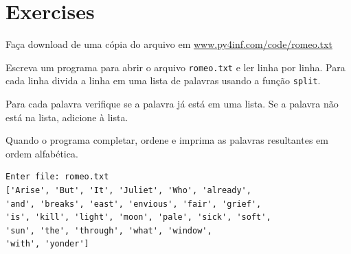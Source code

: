 \begin{description}







\end{description}


\section{Exercises}

\begin{ex}
Faça download de uma cópia do arquivo em
\url{www.py4inf.com/code/romeo.txt}

Escreva um programa para abrir o arquivo {\tt romeo.txt}
e ler linha por linha. Para cada linha divida a linha em uma lista
de palavras usando a função {\tt split}.

Para cada palavra verifique se a palavra já está em uma lista.
Se a palavra não está na lista, adicione à lista.

Quando o programa completar, ordene e imprima as palavras resultantes
em ordem alfabética.

\begin{verbatim}
Enter file: romeo.txt
['Arise', 'But', 'It', 'Juliet', 'Who', 'already', 
'and', 'breaks', 'east', 'envious', 'fair', 'grief', 
'is', 'kill', 'light', 'moon', 'pale', 'sick', 'soft', 
'sun', 'the', 'through', 'what', 'window', 
'with', 'yonder']
\end{verbatim}
\end{ex}

